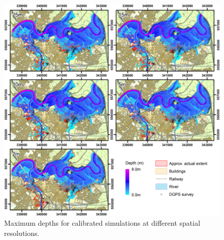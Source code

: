 \begin{figure}[tpb]
	\centering
	\includegraphics[width=1.0\textwidth]{carlisle-figures/Figure5.png}
	\caption{Maximum depths for calibrated simulations at different spatial resolutions.}
	\label{MaxDepths}
\end{figure}
